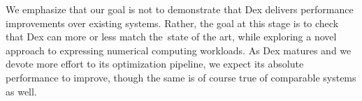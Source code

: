 \documentclass[acmsmall,screen,nonacm]{acmart}
\begin{document}

We emphasize that our goal is not to demonstrate that Dex delivers performance improvements over existing systems.
Rather, the goal at this stage is to check that Dex can more or less match the~state of the art, while exploring a novel approach to expressing numerical computing workloads.
As Dex matures and we devote more effort to its optimization pipeline, we expect its absolute performance to improve, though the same is of course true of comparable systems as well.
\end{document}
